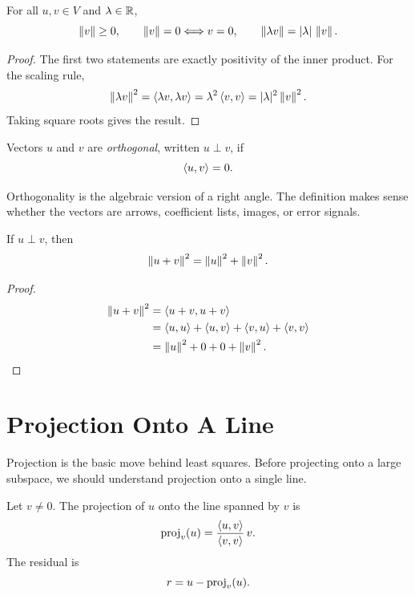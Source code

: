 \begin{proposition}
For all $u,v \in V$ and $\lambda \in \mathbb{R}$,
\[
  \left\lVert v \right\rVert\geq 0,\qquad
  \left\lVert v \right\rVert=0 \Longleftrightarrow v=0,\qquad
  \left\lVert \lambda v \right\rVert=|\lambda|\,\left\lVert v \right\rVert.
\]
\end{proposition}

\begin{proof}
The first two statements are exactly positivity of the inner product. For the
scaling rule,
\[
  \left\lVert \lambda v \right\rVert^2
  = \left\langle \lambda v,\lambda v \right\rangle
  = \lambda^2\left\langle v,v \right\rangle
  = |\lambda|^2\left\lVert v \right\rVert^2.
\]
Taking square roots gives the result.
\end{proof}

\begin{definition}[Orthogonality]
Vectors $u$ and $v$ are \emph{orthogonal}, written $u \perp v$, if
\[
  \left\langle u,v \right\rangle=0.
\]
\end{definition}

Orthogonality is the algebraic version of a right angle. The definition makes
sense whether the vectors are arrows, coefficient lists, images, or error
signals.

\begin{theorem}
If $u \perp v$, then
\[
  \left\lVert u+v \right\rVert^2=\left\lVert u \right\rVert^2+\left\lVert v \right\rVert^2.
\]
\end{theorem}

\begin{proof}
\[
\begin{aligned}
  \left\lVert u+v \right\rVert^2
  &= \left\langle u+v,u+v \right\rangle \\
  &= \left\langle u,u \right\rangle+\left\langle u,v \right\rangle+\left\langle v,u \right\rangle+\left\langle v,v \right\rangle \\
  &= \left\lVert u \right\rVert^2 + 0 + 0 + \left\lVert v \right\rVert^2.
\end{aligned}
\]
\end{proof}

\section{Projection Onto A Line}

Projection is the basic move behind least squares. Before projecting onto a
large subspace, we should understand projection onto a single line.

\begin{definition}
Let $v \neq 0$. The projection of $u$ onto the line spanned by $v$ is
\[
  \operatorname{proj}_v(u)=\frac{\left\langle u,v \right\rangle}{\left\langle v,v \right\rangle}\,v.
\]
The residual is
\[
  r = u-\operatorname{proj}_v(u).
\]
\end{definition}

